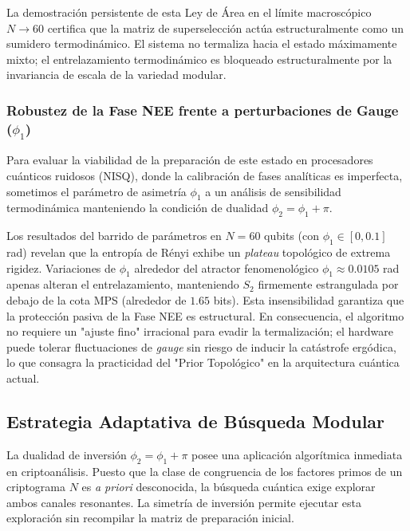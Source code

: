 \documentclass[12pt,a4paper]{article}
\theoremstyle{plain}
\theoremstyle{definition}
\theoremstyle{remark}
\begin{document}
La demostración persistente de esta Ley de Área en el límite macroscópico $N \to 60$ certifica que la matriz de superselección actúa estructuralmente como un sumidero termodinámico. El sistema no termaliza hacia el estado máximamente mixto; el entrelazamiento termodinámico es bloqueado estructuralmente por la invariancia de escala de la variedad modular.

\subsubsection*{Robustez de la Fase NEE frente a perturbaciones de Gauge ($\phi_1$)}

Para evaluar la viabilidad de la preparación de este estado en procesadores cuánticos ruidosos (NISQ), donde la calibración de fases analíticas es imperfecta, sometimos el parámetro de asimetría $\phi_1$ a un análisis de sensibilidad termodinámica manteniendo la condición de dualidad $\phi_2 = \phi_1 + \pi$. 

Los resultados del barrido de parámetros en $N=60$ qubits (con $\phi_1 \in [0, 0.1]$ rad) revelan que la entropía de Rényi exhibe un \textit{plateau} topológico de extrema rigidez. Variaciones de $\phi_1$ alrededor del atractor fenomenológico $\phi_1 \approx 0.0105$ rad apenas alteran el entrelazamiento, manteniendo $S_2$ firmemente estrangulada por debajo de la cota MPS (alrededor de $1.65$ bits). Esta insensibilidad garantiza que la protección pasiva de la Fase NEE es estructural. En consecuencia, el algoritmo no requiere un "ajuste fino" irracional para evadir la termalización; el hardware puede tolerar fluctuaciones de \textit{gauge} sin riesgo de inducir la catástrofe ergódica, lo que consagra la practicidad del "Prior Topológico" en la arquitectura cuántica actual.

\subsection{Estrategia Adaptativa de Búsqueda Modular}
\label{subsec:estrategia_adaptativa}

La dualidad de inversión $\phi_2 = \phi_1 + \pi$ posee una aplicación algorítmica inmediata en criptoanálisis. Puesto que la clase de congruencia de los factores primos de un criptograma $N$ es \textit{a priori} desconocida, la búsqueda cuántica exige explorar ambos canales resonantes. La simetría de inversión permite ejecutar esta exploración sin recompilar la matriz de preparación inicial.
\end{document}
